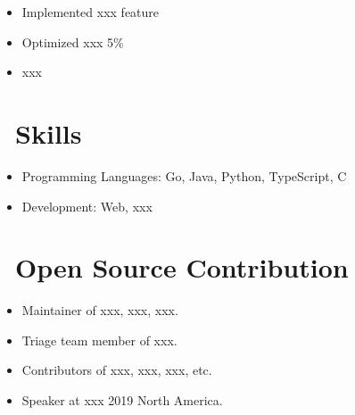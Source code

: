 \documentclass{resume}
\begin{document}
\begin{itemize}
  \item Implemented xxx feature
  \item Optimized xxx 5\%
  \item xxx
\end{itemize}

\section{\faCogs\ Skills}
\begin{itemize}[parsep=0.5ex]
  \item Programming Languages: Go, Java, Python, TypeScript, C
  \item Development: Web, xxx
\end{itemize}

\section{\faInfo\ Open Source Contribution}
\begin{itemize}[parsep=0.5ex]
  \item Maintainer of xxx, xxx, xxx.
  \item Triage team member of xxx.
  \item Contributors of xxx, xxx, xxx, etc.
  \item Speaker at xxx 2019 North America.
\end{itemize}
\end{document}
